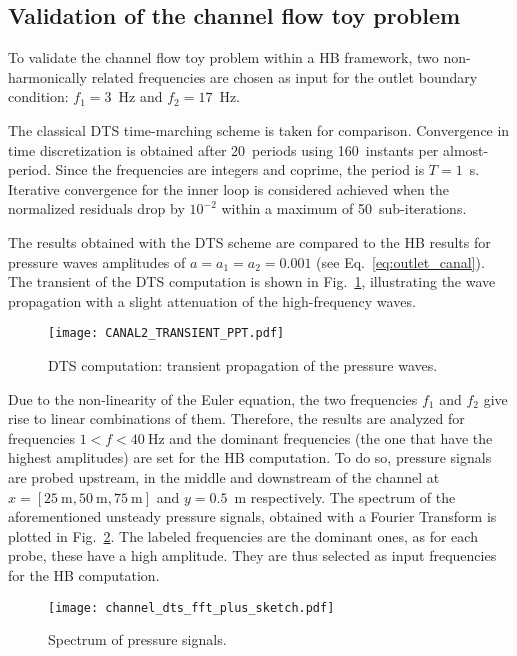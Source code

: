 \subsection{Validation of the channel flow toy problem}
\label{sec:channel_multifreq}

To validate the channel flow toy problem within a HB framework, 
two non-harmonically related
frequencies are chosen as input for the outlet boundary condition:
$f_1 = 3$~Hz and $f_2 = 17$~Hz.

The classical DTS time-marching scheme is taken for comparison.
Convergence in time discretization is obtained after 20~periods using
160~instants per almost-period. Since the frequencies are integers and
coprime, the period is $T=1$~s.  Iterative convergence for the
inner loop is considered achieved when the normalized residuals drop
by $10^{-2}$ within a maximum of 50~sub-iterations.

The results obtained with the DTS scheme are compared to the HB
results for pressure waves amplitudes of $a = a_1 = a_2 = 0.001$
(see Eq.~\eqref{eq:outlet_canal}).  The
transient of the DTS computation is shown in
Fig.~\ref{fig:canal2_transient}, illustrating the wave propagation
with a slight attenuation of the high-frequency waves.
\begin{figure}[htb]
  \centering
  \texttt{[image: CANAL2\_TRANSIENT\_PPT.pdf]}
  \caption{DTS computation: transient propagation of the pressure waves.}
  \label{fig:canal2_transient}
\end{figure}

Due to the non-linearity of the Euler equation, the two frequencies
$f_1$ and $f_2$ give rise to linear combinations of them.
Therefore, the results are analyzed for frequencies $1<f< 40~\textrm{Hz}$ and the
dominant frequencies (the one that have the highest amplitudes) are
set for the HB computation.  To do so, pressure signals are probed
upstream, in the middle and downstream of the channel at
$x=[25~\textrm{m}, 50~\textrm{m}, 75~\textrm{m}]$ and $y=0.5$~m
respectively.  The spectrum of the aforementioned unsteady pressure
signals, obtained with a Fourier Transform is plotted in
Fig.~\ref{fig:canal2_dts_fft}.  The labeled frequencies are the
dominant ones, as for each probe, these have a high amplitude. They
are thus selected as input frequencies for the HB computation.
\begin{figure}[htb]
  \centering
  \texttt{[image: channel\_dts\_fft\_plus\_sketch.pdf]}
  \caption{Spectrum of pressure signals.}
  \label{fig:canal2_dts_fft}
\end{figure}

